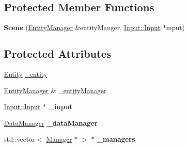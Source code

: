 \subsection*{Protected Member Functions}
\begin{DoxyCompactItemize}
\item 
{\bfseries Scene} (\hyperlink{class_ensum_1_1_components_1_1_entity_manager}{Entity\+Manager} \&entity\+Manger, \hyperlink{class_ensum_1_1_input_1_1_input}{Input\+::\+Input} $\ast$input)\hypertarget{class_ensum_1_1_components_1_1_scene_aee190492d4435b67533941958ff81a8e}{}\label{class_ensum_1_1_components_1_1_scene_aee190492d4435b67533941958ff81a8e}

\end{DoxyCompactItemize}
\subsection*{Protected Attributes}
\begin{DoxyCompactItemize}
\item 
\hyperlink{struct_ensum_1_1_components_1_1_entity}{Entity} \hyperlink{class_ensum_1_1_components_1_1_scene_a8d36e81874a5b07e3edbd8720b8b289e}{\+\_\+entity}
\item 
\hyperlink{class_ensum_1_1_components_1_1_entity_manager}{Entity\+Manager} \& \hyperlink{class_ensum_1_1_components_1_1_scene_af7eb8e3279c5b6768f442ae05b44e75f}{\+\_\+entity\+Manager}
\item 
\hyperlink{class_ensum_1_1_input_1_1_input}{Input\+::\+Input} $\ast$ {\bfseries \+\_\+input}\hypertarget{class_ensum_1_1_components_1_1_scene_ab7ee39773379321c85d73984b03c5568}{}\label{class_ensum_1_1_components_1_1_scene_ab7ee39773379321c85d73984b03c5568}

\item 
\hyperlink{class_ensum_1_1_components_1_1_data_manager}{Data\+Manager} {\bfseries \+\_\+data\+Manager}\hypertarget{class_ensum_1_1_components_1_1_scene_a51e11d82064b37aaf9295d71593792a1}{}\label{class_ensum_1_1_components_1_1_scene_a51e11d82064b37aaf9295d71593792a1}

\item 
std\+::vector$<$ \hyperlink{class_ensum_1_1_components_1_1_manager}{Manager} $\ast$ $>$ $\ast$ {\bfseries \+\_\+managers}\hypertarget{class_ensum_1_1_components_1_1_scene_a9f7c53f74805c8bf7461f9ff2c818be7}{}\label{class_ensum_1_1_components_1_1_scene_a9f7c53f74805c8bf7461f9ff2c818be7}

\end{DoxyCompactItemize}


